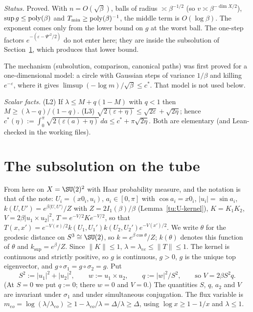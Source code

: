 \noindent\emph{Status.} Proved. With $n=O(\sqrt\beta)$, balls of radius $\asymp\beta^{-1/2}$ (so
$v\asymp\beta^{-\dim X/2}$), $\sup g\le{\rm poly}(\beta)$ and $T_{\min}\ge{\rm poly}(\beta)^{-1}$, the
middle term is $O(\log\beta)$. The exponent comes only from the lower bound on $g$ at the worst ball.
The one-step factors $e^{-(\varepsilon-\Psi'^2/2)}$ do not enter here; they are inside the
subsolution of Section~\ref{tu:L-sec-sub}, which produces that lower bound.

\begin{remark}
The mechanism (subsolution, comparison, canonical paths) was first proved for a one-dimensional model:
a circle with Gaussian steps of variance $1/\beta$ and killing $e^{-\varepsilon}$, where it gives
$\limsup(-\log m)/\sqrt\beta\le c^*$. That model is not used below.
\end{remark}

\noindent\emph{Scalar facts.} (L2) If $\lambda\le M+q(1-M)$ with $q<1$ then $M\ge(\lambda-q)/(1-q)$.
(L3) $\sqrt{2(\varepsilon+\eta)}\le\sqrt{2\varepsilon}+\sqrt{2\eta}$; hence
$c^*(\eta):=\int_0^\pi\sqrt{2(\varepsilon(a)+\eta)}\,da\le c^*+\pi\sqrt{2\eta}$. Both are elementary
(and Lean-checked in the working files).

\section{The subsolution on the tube}\label{tu:L-sec-sub}

From here on $X=\SU(2)^2$ with Haar probability measure, and the notation is that of the note:
$U_i=(x0_i,u_i)$, $a_i\in[0,\pi]$ with $\cos a_i=x0_i$, $|u_i|=\sin a_i$,
$k(U,U')=e^{\beta\langle U,U'\rangle}/Z$ with $Z=2I_1(\beta)/\beta$ (Lemma~\ref{tu:U-kernel}),
$K=K_1K_2$, $V=2\beta|u_1\times u_2|^2$, $T=e^{-V/2}Ke^{-V/2}$, so that
$T(x,x')=e^{-V(x)/2}k(U_1,U_1')k(U_2,U_2')e^{-V(x')/2}$. We write $\theta$ for the geodesic distance
on $S^3\cong\SU(2)$, so $k=e^{\beta\cos\theta}/Z$; $k(\theta)$ denotes this function of $\theta$ and
$k_{\sup}=e^\beta/Z$. Since $\|K\|\le1$, $\lambda=\lambda_{ee}\le\|T\|\le1$. The kernel is continuous
and strictly positive, so $g$ is continuous, $g>0$, $g$ is the unique top eigenvector, and
$g\circ\sigma_1=g\circ\sigma_2=g$. Put
\[
S^2:=|u_1|^2+|u_2|^2,\qquad w:=u_1\times u_2,\qquad q:=|w|^2/S^2,\qquad\text{so } V=2\beta S^2q .
\]
(At $S=0$ we put $q:=0$; there $w=0$ and $V=0$.)
The quantities $S$, $q$, $a_2$ and $V$ are invariant under $\sigma_1$ and under simultaneous
conjugation. The flux variable is $m_{eo}=\log(\lambda/\lambda_{eo})\ge1-\lambda_{eo}/\lambda=\Delta/\lambda\ge\Delta$,
using $\log x\ge1-1/x$ and $\lambda\le1$.


